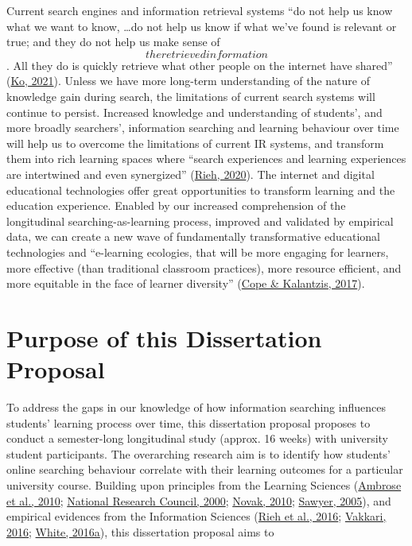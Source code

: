 \documentclass[a4paper, nobind]{templates/ociamthesis}
\begin{document}
Current search engines and information retrieval systems ``do not help us
know what we want to know, \ldots do not help us know if what we've found is
relevant or true; and they do not help us make sense of \[the retrieved
information\]. All they do is quickly retrieve what other people on the
internet have shared'' (\protect\hyperlink{ref-ko2021seeking}{Ko, 2021}). Unless we have more long-term
understanding of the nature of knowledge gain during search, the
limitations of current search systems will continue to persist.
Increased knowledge and understanding of students', and more broadly
searchers', information searching and learning behaviour over time will
help us to overcome the limitations of current IR systems, and transform
them into rich learning spaces where ``search experiences and learning
experiences are intertwined and even synergized'' (\protect\hyperlink{ref-url_rieh_homepage}{Rieh, 2020}).
The internet and digital educational technologies offer great
opportunities to transform learning and the education experience.
Enabled by our increased comprehension of the longitudinal
searching-as-learning process, improved and validated by empirical data,
we can create a new wave of fundamentally transformative educational
technologies and ``e-learning ecologies, that will be more engaging for
learners, more effective (than traditional classroom practices), more
resource efficient, and more equitable in the face of learner diversity''
(\protect\hyperlink{ref-cope2017elearningc}{Cope \& Kalantzis, 2017}).

\hypertarget{sec:intro_purpose}{%
\section{Purpose of this Dissertation Proposal}\label{sec:intro_purpose}}

To address the gaps in our knowledge of how information searching
influences students' learning process over time, this dissertation
proposal proposes to conduct a semester-long longitudinal study (approx.
16 weeks) with university student participants. The overarching research
aim is to identify how students' online searching behaviour correlate
with their learning outcomes for a particular university course.
Building upon principles from the Learning Sciences
(\protect\hyperlink{ref-ambrose2010howa}{Ambrose et al., 2010}; \protect\hyperlink{ref-council2000how}{National Research Council, 2000}; \protect\hyperlink{ref-novak2010learninga}{Novak, 2010}; \protect\hyperlink{ref-sawyer2005cambridge}{Sawyer, 2005}),
and empirical evidences from the Information Sciences
(\protect\hyperlink{ref-rieh2016searching}{Rieh et al., 2016}; \protect\hyperlink{ref-vakkari2016searching}{Vakkari, 2016}; \protect\hyperlink{ref-white2016interactions}{White, 2016a}),
this dissertation proposal aims to
\end{document}
